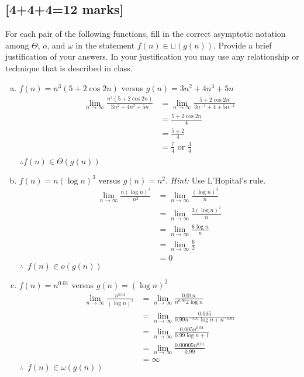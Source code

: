 \documentclass[12pt]{article}
\begin{document}
\subsection{[4+4+4=12 marks]}
For each pair of the following functions, fill in the correct asymptotic
notation among $\Theta$, $o$, and $\omega$ in the statement $f(n)\in
\sqcup(g(n))$.  Provide a brief justification of your answers.  In your
justification you may use any relationship or technique that is described
in class.
\begin{enumerate}[(a)]
\item $f(n) = n^3(5+2\cos{2n})$ versus $g(n)=3n^2+4n^3+5n$
\begin{align*}
\displaystyle\lim_{n \to \infty}\frac{n^3(5 +2\cos{2n})}{3n^2+4n^3+5n}&=\displaystyle\lim_{n \to \infty}\frac{5 + 2\cos{2n}}{3n^{-1}+4+5n^{-2}}\\
&= \frac{5 + 2\cos{2n}}{4}\\
&= \frac{5 \pm 2}{4}\\
&= \frac{7}{4} \text{ or } \frac{3}{4}\\
\end{align*}
$\therefore f(n) \in \Theta (g(n))$\\
\item $f(n) = n (\log n)^{3}$ versus $g(n) = n^{2}$. \emph{Hint:} Use L'Hopital's rule.
\begin{align*}
\displaystyle\lim_{n \to \infty} \frac{n(\log n)^3}{n^2} &= \displaystyle\lim_{n \to \infty} \frac{(\log n)^3}{n}\\
&= \displaystyle\lim_{n \to \infty} \frac{3(\log n)^2}{n}\\
&= \displaystyle\lim_{n \to \infty} \frac{6\log n}{n}\\
&= \displaystyle\lim_{n \to \infty} \frac{6}{2}\\
&= 0
\end{align*}
$\therefore \enspace f(n)\in o(g(n))$  
\item $f(n) = n^{0.01}$ versus $g(n) = (\log n)^{2}$
\begin{align*}
\displaystyle\lim_{n \to \infty} \frac{n^{0.01}}{(\log n)^2} &= \displaystyle\lim_{n \to \infty}\frac{0.01n}{n^{0.99}2\log n}\\
&=\displaystyle\lim_{n \to \infty}\frac{0.005}{0.99n^{-0.01}\log n + n^{-0.01}}\\
&= \displaystyle\lim_{n \to \infty}\frac{0.005n^{0.01}}{0.99\log n + 1}\\
&= \displaystyle\lim_{n \to \infty}\frac{0.00005n^{0.01}}{0.99}\\
&= \infty
\end{align*}
$\therefore \enspace f(n) \in \omega (g(n))$
\end{enumerate}
\newpage
\end{document}
